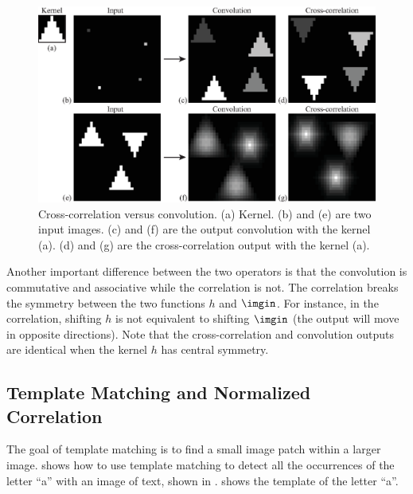 \begin{figure}[t]
	\centerline{
		\includegraphics[width=1\linewidth]{figures/linear_image_filtering/correlation_vs_convolution.eps}
	}
	\caption{Cross-correlation versus convolution. (a) Kernel. (b) and (e) are two input images. (c) and (f) are the output convolution with the kernel (a). (d) and (g) are the cross-correlation output with the kernel (a).}
	\label{fig:corrvsconv}
\end{figure}


Another important difference between the two operators is that the convolution is commutative and associative while the correlation is not. The correlation breaks the symmetry between the two functions $h$ and $\imgin$. For instance, in the correlation, shifting $h$ is not equivalent to shifting $\imgin$ (the output will move in opposite directions). Note that the cross-correlation and convolution outputs are identical when the kernel $h$ has central symmetry.



\subsection{Template Matching and Normalized Correlation}




The goal of template matching is to find a small image patch within a larger image.
\Fig{\ref{fig:normcorr}} shows how to use template matching to detect all the occurrences of the letter ``a'' with an image of text, shown in .  shows the template of the letter ``a''.



